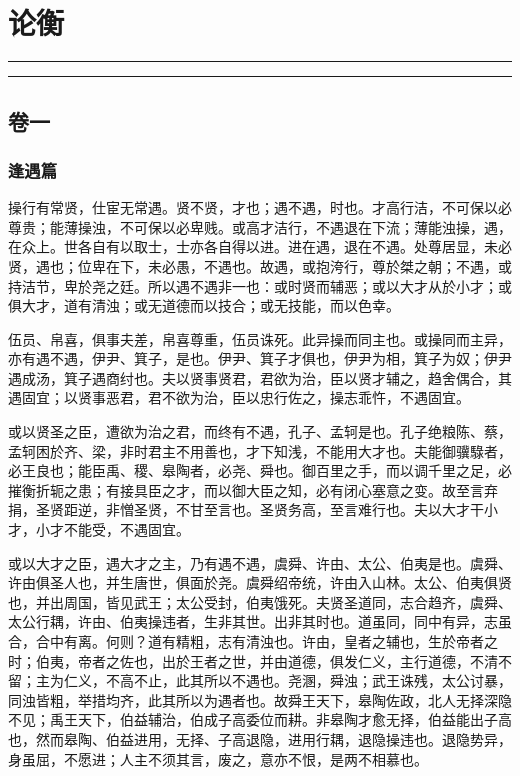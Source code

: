 \documentclass[]{article}
\date{}
\begin{document}
\hypertarget{header-n0}{%
\section{论衡}\label{header-n0}}

\begin{center}\rule{0.5\linewidth}{\linethickness}\end{center}

\tableofcontents

\begin{center}\rule{0.5\linewidth}{\linethickness}\end{center}

\hypertarget{header-n6}{%
\subsection{卷一}\label{header-n6}}

\hypertarget{header-n7}{%
\subsubsection{逢遇篇}\label{header-n7}}

操行有常贤，仕宦无常遇。贤不贤，才也；遇不遇，时也。才高行洁，不可保以必尊贵；能薄操浊，不可保以必卑贱。或高才洁行，不遇退在下流；薄能浊操，遇，在众上。世各自有以取士，士亦各自得以进。进在遇，退在不遇。处尊居显，未必贤，遇也；位卑在下，未必愚，不遇也。故遇，或抱洿行，尊於桀之朝；不遇，或持洁节，卑於尧之廷。所以遇不遇非一也：或时贤而辅恶；或以大才从於小才；或俱大才，道有清浊；或无道德而以技合；或无技能，而以色幸。

伍员、帛喜，俱事夫差，帛喜尊重，伍员诛死。此异操而同主也。或操同而主异，亦有遇不遇，伊尹、箕子，是也。伊尹、箕子才俱也，伊尹为相，箕子为奴；伊尹遇成汤，箕子遇商纣也。夫以贤事贤君，君欲为治，臣以贤才辅之，趋舍偶合，其遇固宜；以贤事恶君，君不欲为治，臣以忠行佐之，操志乖忤，不遇固宜。

或以贤圣之臣，遭欲为治之君，而终有不遇，孔子、孟轲是也。孔子绝粮陈、蔡，孟轲困於齐、梁，非时君主不用善也，才下知浅，不能用大才也。夫能御骥騄者，必王良也；能臣禹、稷、皋陶者，必尧、舜也。御百里之手，而以调千里之足，必摧衡折轭之患；有接具臣之才，而以御大臣之知，必有闭心塞意之变。故至言弃捐，圣贤距逆，非憎圣贤，不甘至言也。圣贤务高，至言难行也。夫以大才干小才，小才不能受，不遇固宜。

或以大才之臣，遇大才之主，乃有遇不遇，虞舜、许由、太公、伯夷是也。虞舜、许由俱圣人也，并生唐世，俱面於尧。虞舜绍帝统，许由入山林。太公、伯夷俱贤也，并出周国，皆见武王；太公受封，伯夷饿死。夫贤圣道同，志合趋齐，虞舜、太公行耦，许由、伯夷操违者，生非其世。出非其时也。道虽同，同中有异，志虽合，合中有离。何则？道有精粗，志有清浊也。许由，皇者之辅也，生於帝者之时；伯夷，帝者之佐也，出於王者之世，并由道德，俱发仁义，主行道德，不清不留；主为仁义，不高不止，此其所以不遇也。尧溷，舜浊；武王诛残，太公讨暴，同浊皆粗，举措均齐，此其所以为遇者也。故舜王天下，皋陶佐政，北人无择深隐不见；禹王天下，伯益辅治，伯成子高委位而耕。非皋陶才愈无择，伯益能出子高也，然而皋陶、伯益进用，无择、子高退隐，进用行耦，退隐操违也。退隐势异，身虽屈，不愿进；人主不须其言，废之，意亦不恨，是两不相慕也。
\end{document}
